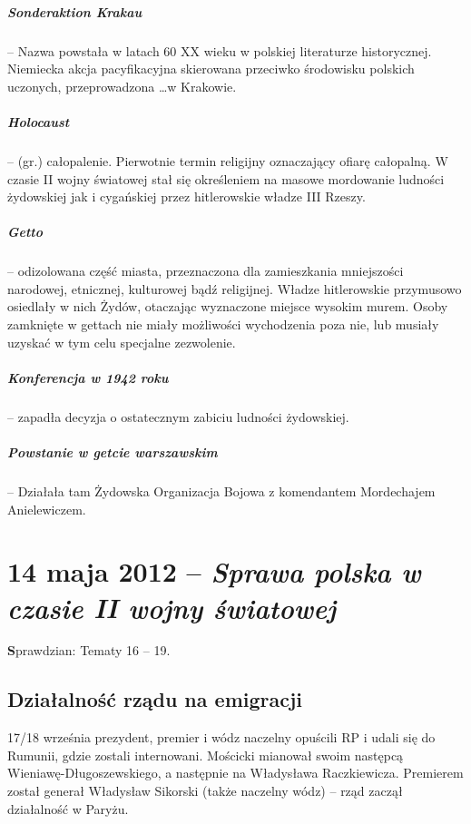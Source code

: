 \documentclass [a4paper, 11pt, oneside]{book}
\begin{document}
\paragraph{Sonderaktion Krakau} -- Nazwa powstała w latach 60 XX wieku w polskiej literaturze historycznej. Niemiecka akcja pacyfikacyjna skierowana przeciwko środowisku polskich uczonych, przeprowadzona \dots w Krakowie.

\paragraph{Holocaust} -- (gr.) całopalenie. Pierwotnie termin religijny oznaczający ofiarę całopalną. W czasie II wojny światowej stał się określeniem na masowe mordowanie ludności żydowskiej jak i cygańskiej przez hitlerowskie władze III Rzeszy.

\paragraph{Getto} -- odizolowana część miasta, przeznaczona dla zamieszkania mniejszości narodowej, etnicznej, kulturowej bądź religijnej. Władze hitlerowskie przymusowo osiedlały w nich Żydów, otaczając wyznaczone miejsce wysokim murem. Osoby zamknięte w gettach nie miały możliwości wychodzenia poza nie, lub musiały uzyskać w tym celu specjalne zezwolenie.

\paragraph{Konferencja w 1942 roku} -- zapadła decyzja o ostatecznym zabiciu ludności żydowskiej.

\paragraph{Powstanie w getcie warszawskim} -- Działała tam Żydowska Organizacja Bojowa z komendantem Mordechajem Anielewiczem.

\chapter{14 maja 2012 -- \textit{Sprawa polska w czasie II wojny światowej}} %
\label{cha:14}
\begin{center}
\textbf Sprawdzian: Tematy 16 -- 19.
\end{center}

\section{Działalność rządu na emigracji} %
\label{sec:dzia_alno_rz_du_na_emigracji}
    17/18 września prezydent, premier i wódz naczelny opuścili RP i udali się do Rumunii, gdzie zostali internowani. Mościcki mianował swoim następcą Wieniawę-Długoszewskiego, a następnie na Władysława Raczkiewicza. Premierem został generał Władysław Sikorski (także naczelny wódz) -- rząd zaczął działalność w Paryżu.
\end{document}
